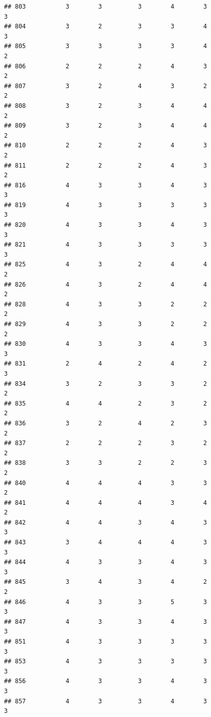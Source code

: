 \documentclass[
]{article}
\begin{document}
\begin{verbatim}
## 803           3        3          3        4        3               3
## 804           3        2          3        3        4               3
## 805           3        3          3        3        4               2
## 806           2        2          2        4        3               2
## 807           3        2          4        3        2               2
## 808           3        2          3        4        4               2
## 809           3        2          3        4        4               2
## 810           2        2          2        4        3               2
## 811           2        2          2        4        3               2
## 816           4        3          3        4        3               3
## 819           4        3          3        3        3               3
## 820           4        3          3        4        3               3
## 821           4        3          3        3        3               3
## 825           4        3          2        4        4               2
## 826           4        3          2        4        4               2
## 828           4        3          3        2        2               2
## 829           4        3          3        2        2               2
## 830           4        3          3        4        3               3
## 831           2        4          2        4        2               3
## 834           3        2          3        3        2               2
## 835           4        4          2        3        2               2
## 836           3        2          4        2        3               2
## 837           2        2          2        3        2               2
## 838           3        3          2        2        3               2
## 840           4        4          4        3        3               2
## 841           4        4          4        3        4               2
## 842           4        4          3        4        3               3
## 843           3        4          4        4        3               3
## 844           4        3          3        4        3               3
## 845           3        4          3        4        2               2
## 846           4        3          3        5        3               3
## 847           4        3          3        4        3               3
## 851           4        3          3        3        3               3
## 853           4        3          3        3        3               3
## 856           4        3          3        4        3               3
## 857           4        3          3        4        3               3

\end{verbatim}
\end{document}

